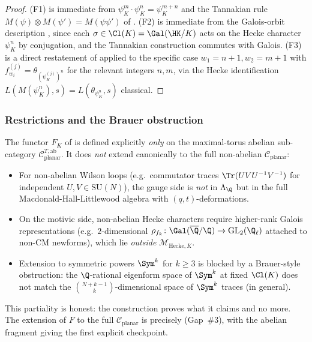 \begin{proof}
(F1) is immediate from $\psi_K^m \cdot \psi_K^n = \psi_K^{m+n}$
and the Tannakian rule $M(\psi) \otimes M(\psi') = M(\psi \psi')$
of . (F2) is immediate from the Galois-orbit
description , since each $\sigma \in \Cl(K) =
\Gal(\HK/K)$ acts on the Hecke character $\psi_K^n$ by
conjugation, and the Tannakian construction commutes with Galois.
(F3) is a direct restatement of  applied to the
specific case $w_1 = n + 1, w_2 = m + 1$ with $f_{w_i}^{(j)} =
\theta_{(\psi_K^{(j)})^{n}}$ for the relevant integers $n, m$,
via the Hecke identification
$L(M(\psi_K^n), s) = L(\theta_{\psi_K^n}, s)$
classical.
\end{proof}

\subsubsection{Restrictions and the Brauer obstruction}
\label{ss:T3-extension}

The functor $F_K$ of  is defined explicitly
\emph{only} on the maximal-torus abelian sub-category
$\mathcal{C}_{\mathrm{planar}}^{T,\mathrm{ab}}$. It does
\emph{not} extend canonically to the full non-abelian
$\mathcal{C}_{\mathrm{planar}}$:
\begin{itemize}
\item For non-abelian Wilson loops (e.g.\ commutator traces
$\Tr(UVU^{-1}V^{-1})$ for independent $U, V \in \mathrm{SU}(N)$),
the gauge side is \emph{not} in $\Lambda_\Q$ but in the full
Macdonald-Hall-Littlewood algebra with $(q, t)$-deformations.
\item On the motivic side, non-abelian Hecke characters require
higher-rank Galois representations (e.g.\ $2$-dimensional
$\rho_{f_k} \colon \Gal(\overline{\Q}/\Q) \to \mathrm{GL}_2(\Q_\ell)$
attached to non-CM newforms), which lie \emph{outside}
$\mathcal{M}_{\mathrm{Hecke}, K}$.
\item Extension to symmetric powers $\Sym^k$ for $k \geq 3$ is
blocked by a Brauer-style obstruction: the $\Q$-rational
eigenform space of $\Sym^k$ at fixed $\Cl(K)$ does not match the
$\binom{N+k-1}{k}$-dimensional space of $\Sym^k$ traces (in
general).
\end{itemize}

This partiality is honest: the construction proves what it claims
and no more. The extension of $F$ to the full
$\mathcal{C}_{\mathrm{planar}}$ is precisely
 (Gap~\#3), with the abelian fragment
 giving the first explicit checkpoint.

